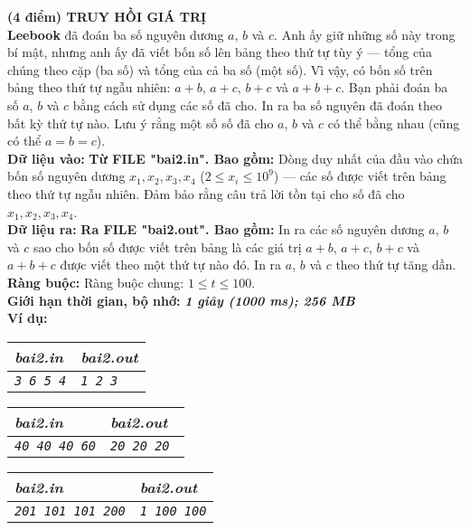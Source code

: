 \begin{ex}
	\textbf{(4 điểm) TRUY HỒI GIÁ TRỊ}\\
	\textbf{Leebook} đã đoán ba số nguyên dương $a$, $b$ và $c$. Anh ấy giữ những số này trong bí mật, nhưng anh ấy đã viết bốn số lên bảng theo thứ tự tùy ý — tổng của chúng theo cặp (ba số) và tổng của cả ba số (một số). Vì vậy, có bốn số trên bảng theo thứ tự ngẫu nhiên: $a+b$, $a+c$, $b+c$ và $a+b+c$. Bạn phải đoán ba số $a$, $b$ và $c$ bằng cách sử dụng các số đã cho. In ra ba số nguyên đã đoán theo bất kỳ thứ tự nào. Lưu ý rằng một số số đã cho $a$, $b$ và $c$ có thể bằng nhau (cũng có thể $a=b=c$).\\
	\textbf{Dữ liệu vào: }\textbf{Từ FILE "bai2.in". Bao gồm: }
	Dòng duy nhất của đầu vào chứa bốn số nguyên dương $x_1, x_2, x_3, x_4$ ($2 \le x_i \le 10^9$) — các số được viết trên bảng theo thứ tự ngẫu nhiên. Đảm bảo rằng câu trả lời tồn tại cho số đã cho $x_1, x_2, x_3, x_4$.\\
	\textbf{Dữ liệu ra: }\textbf{Ra FILE "bai2.out". Bao gồm: }In ra các số nguyên dương $a$, $b$ và $c$ sao cho bốn số được viết trên bảng là các giá trị $a+b$, $a+c$, $b+c$ và $a+b+c$ được viết theo một thứ tự nào đó. In ra $a$, $b$ và $c$ theo thứ tự tăng dần. \\
	\textbf{Ràng buộc: } Ràng buộc chung: $1 \leq t \leq 100$.\\
	\textbf{Giới hạn thời gian, bộ nhớ: } \textbf{\textit{1 giây (1000 ms); 256 MB}} \\
	\textbf{Ví dụ: }
	\begin{center}
		\begin{multicols}{3}
			\begin{tabular}{|l|l|}
				\hline
				\textit{\textbf{\textsf{bai2.in}}} & \textit{\textbf{\textsf{bai2.out}}} \\ %
				\hline
				\textit{\texttt{3 6 5 4}}          & \textit{\texttt{1 2 3}}             \\
				\hline
			\end{tabular}
			\vfil\null \columnbreak
			\begin{tabular}{|l|l|}
				\hline
				\textit{\textbf{\textsf{bai2.in}}} & \textit{\textbf{\textsf{bai2.out}}} \\ %
				\hline
				\textit{\texttt{40 40 40 60}}      & \textit{\texttt{20 20 20 }}         \\
				\hline
			\end{tabular}
			\vfil\null \columnbreak
			\begin{tabular}{|l|l|}
				\hline
				\textit{\textbf{\textsf{bai2.in}}} & \textit{\textbf{\textsf{bai2.out}}} \\ %
				\hline
				\textit{\texttt{201 101 101 200}}  & \textit{\texttt{1 100 100}}         \\
				\hline
			\end{tabular}
		\end{multicols}
	\end{center}
\end{ex}

